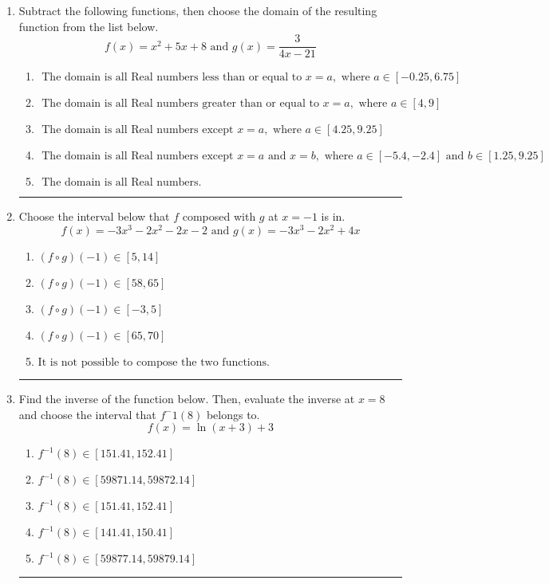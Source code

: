 \documentclass[14pt]{extbook}
\newcommand{\litem}[1]{\item#1\hspace*{-1cm}\rule{\textwidth}{0.4pt}}
\begin{document}
\begin{enumerate}
{\begin{enumerate}[label=\Alph*.]
\end{enumerate} }
\litem{
Subtract the following functions, then choose the domain of the resulting function from the list below.\[ f(x) = x^{2} +5 x + 8 \text{ and } g(x) = \frac{3}{4x-21} \]\begin{enumerate}[label=\Alph*.]
\item \( \text{ The domain is all Real numbers less than or equal to } x = a, \text{ where } a \in [-0.25, 6.75] \)
\item \( \text{ The domain is all Real numbers greater than or equal to } x = a, \text{ where } a \in [4, 9] \)
\item \( \text{ The domain is all Real numbers except } x = a, \text{ where } a \in [4.25, 9.25] \)
\item \( \text{ The domain is all Real numbers except } x = a \text{ and } x = b, \text{ where } a \in [-5.4, -2.4] \text{ and } b \in [1.25, 9.25] \)
\item \( \text{ The domain is all Real numbers. } \)

\end{enumerate} }
\litem{
Choose the interval below that $f$ composed with $g$ at $x=-1$ is in.\[ f(x) = -3x^{3} -2 x^{2} -2 x -2 \text{ and } g(x) = -3x^{3} -2 x^{2} +4 x \]\begin{enumerate}[label=\Alph*.]
\item \( (f \circ g)(-1) \in [5, 14] \)
\item \( (f \circ g)(-1) \in [58, 65] \)
\item \( (f \circ g)(-1) \in [-3, 5] \)
\item \( (f \circ g)(-1) \in [65, 70] \)
\item \( \text{It is not possible to compose the two functions.} \)

\end{enumerate} }
\litem{
Find the inverse of the function below. Then, evaluate the inverse at $x = 8$ and choose the interval that $f^-1(8)$ belongs to.\[ f(x) = \ln{(x+3)}+3 \]\begin{enumerate}[label=\Alph*.]
\item \( f^{-1}(8) \in [151.41, 152.41] \)
\item \( f^{-1}(8) \in [59871.14, 59872.14] \)
\item \( f^{-1}(8) \in [151.41, 152.41] \)
\item \( f^{-1}(8) \in [141.41, 150.41] \)
\item \( f^{-1}(8) \in [59877.14, 59879.14] \)


\end{enumerate}}
\end{enumerate}
\end{document}
